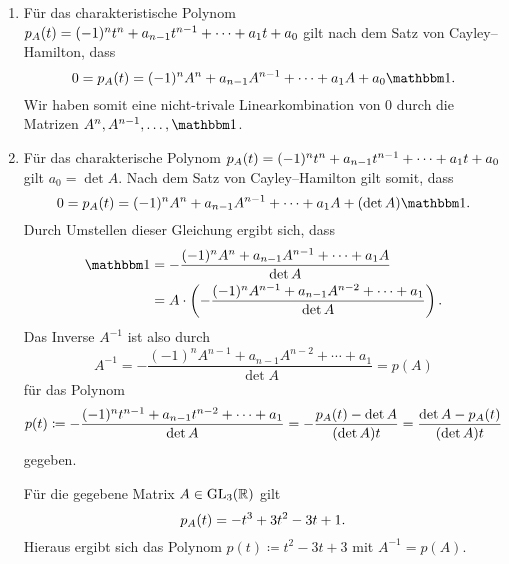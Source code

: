 \documentclass[a4paper, 10pt]{scrartcl}
\begin{document}
\begin{solution}
  \begin{enumerate}
    \item
      Für das charakteristische Polynom $p_{A}(t) = (-1)^n t^n + a_{n-1} t^{n-1} + \dotsb + a_1 t + a_0$ gilt nach dem Satz von Cayley--Hamilton, dass
      \[
          0
        = \charpol{A}(t)
        = (-1)^n A^n + a_{n-1} A^{n-1} + \dotsb + a_1 A + a_0 \Id.
      \]
      Wir haben somit eine nicht-trivale Linearkombination von $0$ durch die Matrizen $A^n, A^{n-1}, \dotsc, \Id$.
    \item
      Für das charakterische Polynom $p_{A}(t) = (-1)^n t^n + a_{n-1} t^{n-1} + \dotsb + a_1 t + a_0$ gilt $a_0 = \det A$.
      Nach dem Satz von Cayley--Hamilton gilt somit, dass
      \[
          0
        = \charpol{A}(t)
        = (-1)^n A^n + a_{n-1} A^{n-1} + \dotsb + a_1 A + (\det A) \Id.
      \]
      Durch Umstellen dieser Gleichung ergibt sich, dass
      \begin{align*}
            \Id
        &=  - \frac{(-1)^n A^n + a_{n-1} A^{n-1} + \dotsb + a_1 A}{\det A} \\
        &=  A \cdot \left( - \frac{(-1)^n A^{n-1} + a_{n-1} A^{n-2} + \dotsb + a_1}{\det A} \right).
      \end{align*}
      Das Inverse $A^{-1}$ ist also durch
      \[
          A^{-1}
        = - \frac{(-1)^n A^{n-1} + a_{n-1} A^{n-2} + \dotsb + a_1}{\det A}
        = p(A)
      \]
      für das Polynom
      \[
                  p(t)
        \coloneqq - \frac{(-1)^n t^{n-1} + a_{n-1} t^{n-2} + \dotsb + a_1}{\det A}
        =         - \frac{ p_{A}(t) - \det A}{(\det A) t}
        =         \frac{\det A - p_{A}(t)}{(\det A) t}
      \]
      gegeben.
      
      Für die gegebene Matrix $A \in \operatorname{GL}_{3}(\mathbb{R})$ gilt
      \[
          p_{A}(t)
        = -t^3 + 3 t^2 - 3 t + 1.
      \]
      Hieraus ergibt sich das Polynom $p(t) \coloneqq t^2 - 3 t + 3$ mit $A^{-1} = p(A)$.
  \end{enumerate}
\end{solution}
\end{document}

